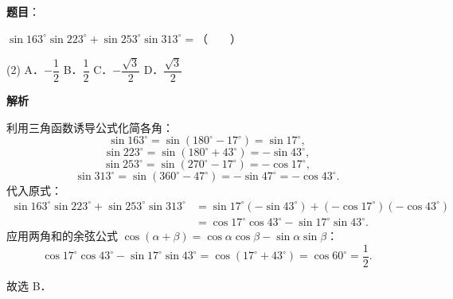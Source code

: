 \begin{answer}

\textbf{题目}：

$\sin 163^\circ \sin 223^\circ + \sin 253^\circ \sin 313^\circ =$\mbox{（　　）}

\begin{gkopts}(2)
\task A．$-\dfrac{1}{2}$
\task B．$\dfrac{1}{2}$
\task C．$-\dfrac{\sqrt{3}}{2}$
\task D．$\dfrac{\sqrt{3}}{2}$
\end{gkopts}

\textbf{解析}

利用三角函数诱导公式化简各角：
\nopagebreak[4]
\[
\sin 163^\circ = \sin(180^\circ - 17^\circ) = \sin 17^\circ,
\]
\nopagebreak[4]
\[
\sin 223^\circ = \sin(180^\circ + 43^\circ) = -\sin 43^\circ,
\]
\nopagebreak[4]
\[
\sin 253^\circ = \sin(270^\circ - 17^\circ) = -\cos 17^\circ,
\]
\nopagebreak[4]
\[
\sin 313^\circ = \sin(360^\circ - 47^\circ) = -\sin 47^\circ = -\cos 43^\circ.
\]
代入原式：
\nopagebreak[4]
\[
\begin{aligned}
\sin 163^\circ \sin 223^\circ + \sin 253^\circ \sin 313^\circ &= \sin 17^\circ (-\sin 43^\circ) + (-\cos 17^\circ)(-\cos 43^\circ) \\
&= \cos 17^\circ \cos 43^\circ - \sin 17^\circ \sin 43^\circ.
\end{aligned}
\]
应用两角和的余弦公式 $\cos(\alpha + \beta) = \cos\alpha \cos\beta - \sin\alpha \sin\beta$：
\nopagebreak[4]
\[
\cos 17^\circ \cos 43^\circ - \sin 17^\circ \sin 43^\circ = \cos(17^\circ + 43^\circ) = \cos 60^\circ = \frac{1}{2}.
\]

故选 B．


\end{answer}
